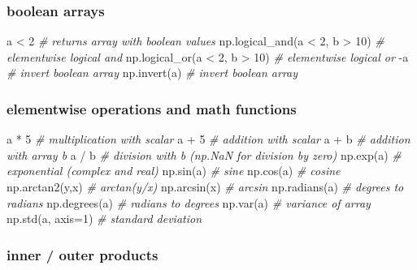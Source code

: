 \documentclass[]{article}
\newenvironment{Shaded}{}{}
\newcommand{\DecValTok}[1]{\textcolor[rgb]{0.25,0.63,0.44}{{#1}}}
\newcommand{\CommentTok}[1]{\textcolor[rgb]{0.38,0.63,0.69}{\textit{{#1}}}}
\newcommand{\NormalTok}[1]{{#1}}
\begin{document}
\subsubsection{boolean arrays}

\begin{Shaded}
\begin{Highlighting}[]
\NormalTok{a < }\DecValTok{2} \CommentTok{# returns array with boolean values}
\NormalTok{np.logical_and(a < }\DecValTok{2}\NormalTok{, b > }\DecValTok{10}\NormalTok{) }\CommentTok{# elementwise logical and}
\NormalTok{np.logical_or(a < }\DecValTok{2}\NormalTok{, b > }\DecValTok{10}\NormalTok{) }\CommentTok{# elementwise logical or}
\NormalTok{-a }\CommentTok{# invert boolean array}
\NormalTok{np.invert(a) }\CommentTok{# invert boolean array}
\end{Highlighting}
\end{Shaded}

\subsubsection{elementwise operations and math functions}

\begin{Shaded}
\begin{Highlighting}[]
\NormalTok{a * }\DecValTok{5} \CommentTok{# multiplication with scalar}
\NormalTok{a + }\DecValTok{5} \CommentTok{# addition with scalar}
\NormalTok{a + b }\CommentTok{# addition with array b}
\NormalTok{a / b }\CommentTok{# division with b (np.NaN for division by zero)}
\NormalTok{np.exp(a) }\CommentTok{# exponential (complex and real)}
\NormalTok{np.sin(a) }\CommentTok{# sine}
\NormalTok{np.cos(a) }\CommentTok{# cosine}
\NormalTok{np.arctan2(y,x) }\CommentTok{# arctan(y/x)}
\NormalTok{np.arcsin(x) }\CommentTok{# arcsin}
\NormalTok{np.radians(a) }\CommentTok{# degrees to radians}
\NormalTok{np.degrees(a) }\CommentTok{# radians to degrees}
\NormalTok{np.var(a) }\CommentTok{# variance of array}
\NormalTok{np.std(a, axis=}\DecValTok{1}\NormalTok{) }\CommentTok{# standard deviation}
\end{Highlighting}
\end{Shaded}

\subsubsection{inner / outer products}
\end{document}
